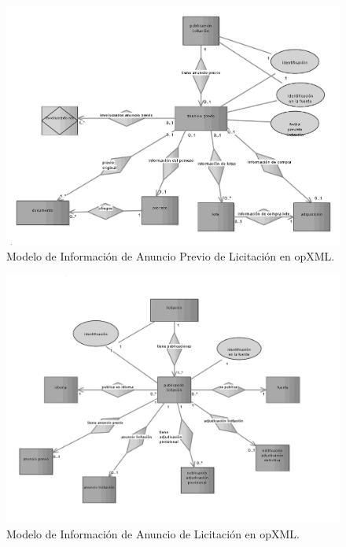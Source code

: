 \begin{figure}[!htb]
\centering
	\includegraphics[width=16cm]{images/phd/eproc/10ders-2}
\caption{Modelo de Información de Anuncio Previo de Licitación en opXML.}
\label{fig:10ders-2}
\end{figure}


\begin{figure}[!htb]
\centering
	\includegraphics[width=16cm]{images/phd/eproc/10ders-1}
\caption{Modelo de Información de Anuncio de Licitación en opXML.}
\label{fig:10ders-1}
\end{figure}


